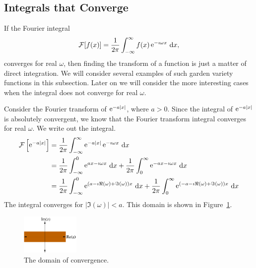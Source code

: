 \subsection{Integrals that Converge}

If the Fourier integral
\[ 
\mathcal{F}[f(x)] = \frac{1}{2\pi} \int_{-\infty}^\infty f(x) \mathop{\mathrm{e}}\nolimits^{-\imath \omega x}\,\mathrm{d} x,
\]
converges for real $\omega$, then finding the transform of a function
is just a matter of direct integration.  We will consider several examples
of such garden variety functions in this subsection.  Later on we will
consider the more interesting cases when the integral does not converge for
real $\omega$.






\begin{Example}
  Consider the Fourier transform of $\mathop{\mathrm{e}}\nolimits^{-a |x|}$, where $a > 0$.
  Since the integral of $\mathop{\mathrm{e}}\nolimits^{-a |x|}$ is absolutely convergent, we know
  that the Fourier transform integral converges for real $\omega$.  We write out
  the integral.
  \begin{align*}
    \mathcal{F}\left[ \mathop{\mathrm{e}}\nolimits^{-a |x|} \right] 
    &= \frac{1}{2\pi} \int_{-\infty}^\infty \mathop{\mathrm{e}}\nolimits^{-a |x|} \mathop{\mathrm{e}}\nolimits^{-\imath \omega x}\,\mathrm{d} x 
    \\
    &= \frac{1}{2\pi} \int_{-\infty}^0 \mathop{\mathrm{e}}\nolimits^{a x - \imath \omega x}\,\mathrm{d} x 
    + \frac{1}{2\pi} \int_0^\infty \mathop{\mathrm{e}}\nolimits^{-a x - \imath \omega x}\,\mathrm{d} x 
    \\
    &= \frac{1}{2\pi} \int_{-\infty}^0 \mathop{\mathrm{e}}\nolimits^{( a - \imath \Re(\omega) + \Im(\omega) ) x} \,\mathrm{d} x + 
    \frac{1}{2\pi} \int_0^\infty \mathop{\mathrm{e}}\nolimits^{( -a - \imath \Re(\omega) + \Im(\omega) ) x}\,\mathrm{d} x
  \end{align*}
  The integral converges for $|\Im(\omega)| < a$.  This 
  domain is shown in Figure~\ref{fig_dom_conv}.



  \begin{figure}[h!]
    \begin{center}
      \includegraphics[width=0.25\textwidth]{ode/fourier_transform/fig_dom_conv}
    \end{center}
    \caption{The domain of convergence.}
    \label{fig_dom_conv}
  \end{figure}





\end{Example}
